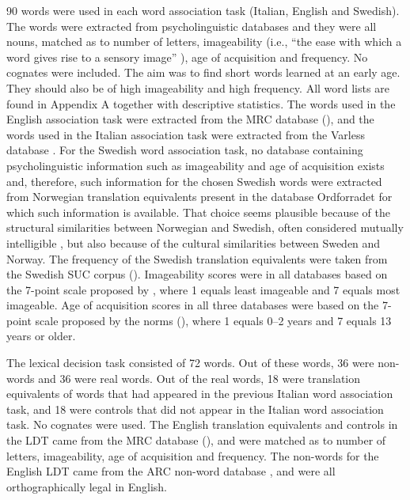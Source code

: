 \documentclass[output=paper,colorlinks,citecolor=brown,nonflat]{langsci/langscibook}
\begin{document}
 90 words were used in each word association task (Italian, English and Swedish). The words were extracted from psycholinguistic databases and they were all nouns, matched as to number of letters, imageability (i.e., “the ease with which a word gives rise to a sensory image” \citealt[73]{BirdEtAl2001}), age of acquisition and frequency. No cognates were included. The aim was to find short words learned at an early age. They should also be of high imageability and high frequency. All word lists are found in Appendix A together with descriptive statistics. The words used in the English association task were extracted from the MRC database (\citealt{Coltheart1981, Wilson1988}), and the words used in the Italian association task were extracted from the Varless database \citep{BuraniEtAl2001}. For the Swedish word association task, no database containing psycholinguistic information such as imageability and age of acquisition exists and, therefore, such information for the chosen Swedish words were extracted from Norwegian translation equivalents present in the database Ordforradet \citep{LindEtAl2013} for which such information is available. That choice seems plausible because of the structural similarities between Norwegian and Swedish, often considered mutually intelligible \citep{Gooskens2010}, but also because of the cultural similarities between Sweden and Norway. The frequency of the Swedish translation equivalents were taken from the Swedish SUC corpus (\citealt{Gustafson-CapkováHartmann2006}). Imageability scores were in all databases based on the 7-point scale proposed by \citet{PaivioEtAl1968}, where 1 equals least imageable and 7 equals most imageable. Age of acquisition scores in all three databases were based on the 7-point scale proposed by the \citeauthor{GilhoolyLogie1980} norms (\citeyear{GilhoolyLogie1980}), where 1 equals 0--2 years and 7 equals 13 years or older.

 The lexical decision task consisted of 72 words. Out of these words, 36 were non-words and 36 were real words. Out of the real words, 18 were translation equivalents of words that had appeared in the previous Italian word association task, and 18 were controls that did not appear in the Italian word association task. No cognates were used. The English translation equivalents and controls in the LDT came from the MRC database (\citealt{Coltheart1981, Wilson1988}), and were matched as to number of letters, imageability, age of acquisition and frequency. The non-words for the English LDT came from the ARC non-word database \citep{RastleEtAl2002}, and were all orthographically legal in English.
\end{document}
